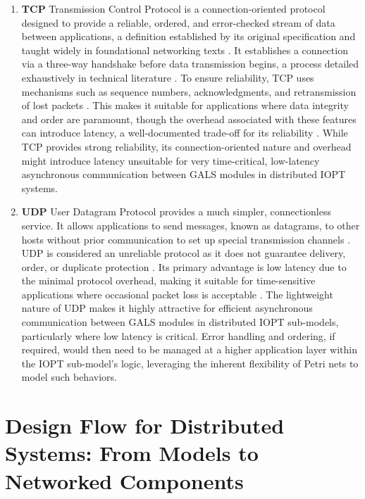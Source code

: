 \begin{enumerate}
    \item \textbf{TCP} Transmission Control Protocol is a connection-oriented protocol designed to provide a reliable, ordered, and error-checked stream of data between applications, a definition established by its original specification \cite{rfc793} and taught widely in foundational networking texts \cite{kurose2021}. It establishes a connection via a three-way handshake before data transmission begins, a process detailed exhaustively in technical literature \cite{stevens1994}. To ensure reliability, TCP uses mechanisms such as sequence numbers, acknowledgments, and retransmission of lost packets \cite{rfc793}. This makes it suitable for applications where data integrity and order are paramount, though the overhead associated with these features can introduce latency, a well-documented trade-off for its reliability \cite{kurose2021, stevens1994}. While TCP provides strong reliability, its connection-oriented nature and overhead might introduce latency unsuitable for very time-critical, low-latency asynchronous communication between GALS modules in distributed IOPT systems.
    \item \textbf{UDP} User Datagram Protocol provides a much simpler, connectionless service. It allows applications to send messages, known as datagrams, to other hosts without prior communication to set up special transmission channels \cite{rfc768}. UDP is considered an unreliable protocol as it does not guarantee delivery, order, or duplicate protection \cite{kurose2021}. Its primary advantage is low latency due to the minimal protocol overhead, making it suitable for time-sensitive applications where occasional packet loss is acceptable \cite{forouzan2010}. The lightweight nature of UDP makes it highly attractive for efficient asynchronous communication between GALS modules in distributed IOPT sub-models, particularly where low latency is critical. Error handling and ordering, if required, would then need to be managed at a higher application layer within the IOPT sub-model's logic, leveraging the inherent flexibility of Petri nets to model such behaviors. 

\end{enumerate}

 

\section{Design Flow for Distributed Systems: From Models to Networked Components }
\label{sec:design_flow}

